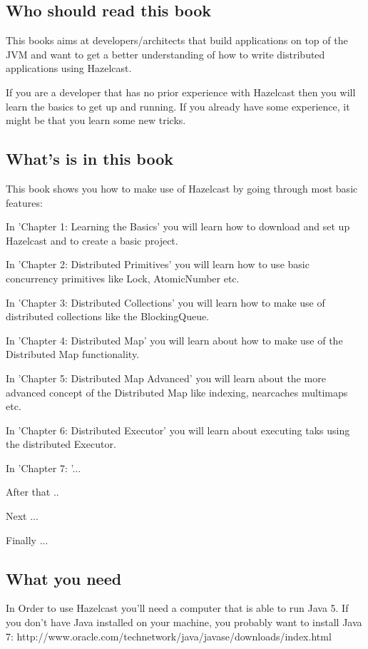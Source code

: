 \subsection*{Who should read this book}
This books aims at developers/architects that build applications on top of the JVM and want to get a better understanding of
how to write distributed applications using Hazelcast.

If you are a developer that has no prior experience with Hazelcast then you will learn the basics to get up and running. If you 
already have some experience, it might be that you learn some new tricks.

\subsection*{What's is in this book}

This book shows you how to make use of Hazelcast by going through most basic features:

In 'Chapter 1: Learning the Basics' you will learn how to download and set up Hazelcast and to create a basic project.

In 'Chapter 2: Distributed Primitives' you will learn how to use basic concurrency primitives like Lock, AtomicNumber etc.

In 'Chapter 3: Distributed Collections' you will learn how to make use of distributed collections like the BlockingQueue.

In 'Chapter 4: Distributed Map' you will learn about how to make use of the Distributed Map functionality.

In 'Chapter 5: Distributed Map Advanced' you will learn about the more advanced concept of the Distributed Map like indexing, nearcaches
multimaps etc.

In 'Chapter 6: Distributed Executor' you will learn about executing taks using the distributed Executor.

In 'Chapter 7: '...

After that ..

Next ...

Finally ...

\subsection*{What you need}
In Order to use Hazelcast you'll need a computer that is able to run Java 5. If you don't have Java installed on your machine,
you probably want to install Java 7: 
http://www.oracle.com/technetwork/java/javase/downloads/index.html

